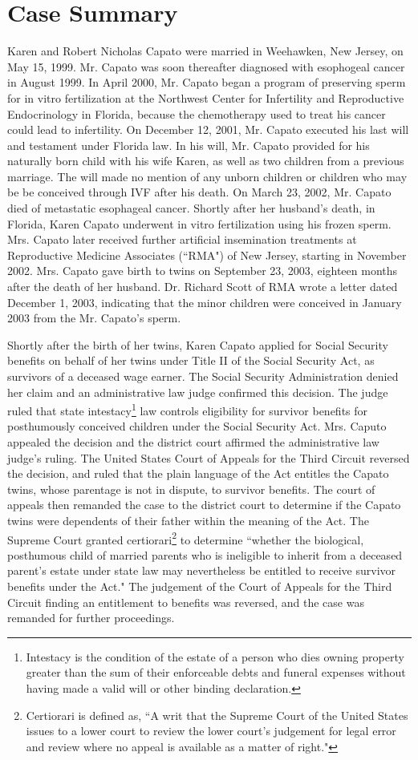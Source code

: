 \documentclass[letterpaper,10pt]{article}
\begin{document}
\section*{Case Summary}
Karen and Robert Nicholas Capato were married in Weehawken, New Jersey, on May 15, 1999.  Mr. Capato was soon thereafter diagnosed with esophogeal cancer in August 1999.  In April 2000, Mr. Capato began a program of preserving sperm for in vitro fertilization at the Northwest Center for Infertility and Reproductive Endocrinology in Florida, because the chemotherapy used to treat his cancer could lead to infertility.  On December 12, 2001, Mr. Capato executed his last will and testament under Florida law.  In his will, Mr. Capato provided for his naturally born child with his wife Karen, as well as two children from a previous marriage. The will made no mention of any unborn children or children who may be be conceived through IVF after his death.  On March 23, 2002, Mr. Capato died of metastatic esophageal cancer.  Shortly after her husband's death, in Florida, Karen Capato underwent in vitro fertilization using his frozen sperm.  Mrs. Capato later received further artificial insemination treatments at Reproductive Medicine Associates (``RMA") of New Jersey, starting in November 2002.  Mrs. Capato gave birth to twins on September 23, 2003, eighteen months after the death of her husband.  Dr. Richard Scott of RMA wrote a letter dated December 1, 2003, indicating that the minor children were conceived in January 2003 from the Mr. Capato's sperm.

Shortly after the birth of her twins, Karen Capato applied for Social Security benefits on behalf of her twins under Title II of the Social Security Act, as survivors of a deceased wage earner. The Social Security Administration denied her claim and an administrative law judge confirmed this decision.  The judge ruled that state intestacy\footnote{Intestacy is the condition of the estate of a person who dies owning property greater than the sum of their enforceable debts and funeral expenses without having made a valid will or other binding declaration.} law controls eligibility for survivor benefits for posthumously conceived children under the Social Security Act.  Mrs. Caputo appealed the decision and the district court affirmed the administrative law judge's ruling.  The United States Court of Appeals for the Third Circuit reversed the decision, and ruled that the plain language of the Act entitles the Capato twins, whose parentage is not in dispute, to survivor benefits.  The court of appeals then remanded the case to the district court to determine if the Capato twins were dependents of their father within the meaning of the Act. The Supreme Court granted certiorari\footnote{Certiorari is defined as, ``A writ that the Supreme Court of the United States issues to a lower court to review the lower court's judgement for legal error and review where no appeal is available as a matter of right."} to determine ``whether the biological, posthumous child of married parents who is ineligible to inherit from a deceased parent's estate under state law may nevertheless be entitled to receive survivor benefits under the Act."  The judgement of the Court of Appeals for the Third Circuit finding an entitlement to benefits was reversed, and the case was remanded for further proceedings.
\end{document}
